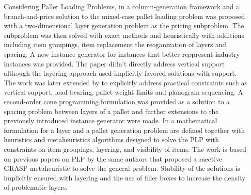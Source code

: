 Considering Pallet Loading Problems, in \cite{elhedhli2019three} a column-generation framework and a branch-and-price solution to the mixed-case pallet loading problem was proposed with a two-dimensional layer generation problem as the pricing subproblem.
The subproblem was then solved with exact methods and heuristically with additions including item groupings, item replacement the reoganization of layers and spacing.
A new instance generator for instances that better reppresent industry instances was provided. The paper didn't directly address vertical support although the layering approach used implicitly favored solutions with support.
The work was later extended by \cite{GZARA20201062} to explicitly address practical constraints such as vertical support, load bearing, pallet weight limits and planogram sequencing.
A second-order cone programming formulation was provided as a solution to a spacing problem between layers of a pallet and further extensions to the previously introduced instance generator were made.
In \cite{Calzavara2021} a mathematical formulation for a layer and a pallet generation problem are defined together with heuristics and metaheuristics algorithms designed to solve the PLP with constraints on item groupings, layering, and visibility of items.
The work is based on previous papers on PLP by the same authors \cite{Iori2020a, Iori2020b, Iori2021} that proposed a raective GRASP metaheuristic to solve the general problem.
Stability of the solutions is implicitly ensured with layering and the use of filler boxes to increase the density of problematic layers.